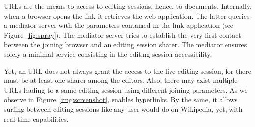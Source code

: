 URLs are the means to access to editing sessions, hence, to
documents. Internally, when a browser opens the link it retrieves the web
application. The latter queries a mediator server with the parameters contained
in the link application (see Figure~\ref{fig:spray}). The mediator server tries
to establish the very first contact between the joining browser and an editing
session sharer.  The mediator ensures solely a minimal service consisting in the
editing session accessibility.

Yet, an URL does not always grant the access to the live editing session, for
there must be at least one sharer among the editors. Also, there may exist
multiple URLs leading to a same editing session using different joining
parameters. As we observe in Figure~\ref{img:screenshot}, \CRATE enables
hyperlinks. By the same, it allows surfing between editing sessions like any
user would do on Wikipedia, yet, with real-time capabilities.
